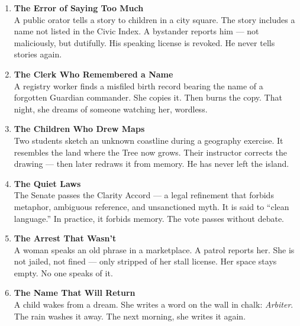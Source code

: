 \documentclass[9pt]{article}
\begin{document}
\begin{center}
\begin{enumerate}
    \item \textbf{The Error of Saying Too Much} \\
    A public orator tells a story to children in a city square. The story includes a name not listed in the Civic Index. A bystander reports him — not maliciously, but dutifully. His speaking license is revoked. He never tells stories again.

    \vspace{.3in}
    \item \textbf{The Clerk Who Remembered a Name} \\
    A registry worker finds a misfiled birth record bearing the name of a forgotten Guardian commander. She copies it. Then burns the copy. That night, she dreams of someone watching her, wordless.

    \vspace{.3in}
    \item \textbf{The Children Who Drew Maps} \\
    Two students sketch an unknown coastline during a geography exercise. It resembles the land where the Tree now grows. Their instructor corrects the drawing — then later redraws it from memory. He has never left the island.

    \vspace{.3in}
    \item \textbf{The Quiet Laws} \\
    The Senate passes the Clarity Accord — a legal refinement that forbids metaphor, ambiguous reference, and unsanctioned myth. It is said to “clean language.” In practice, it forbids memory. The vote passes without debate.

    \vspace{.3in}
    \item \textbf{The Arrest That Wasn’t} \\
    A woman speaks an old phrase in a marketplace. A patrol reports her. She is not jailed, not fined — only stripped of her stall license. Her space stays empty. No one speaks of it.

    \vspace{.3in}
    \item \textbf{The Name That Will Return} \\
    A child wakes from a dream. She writes a word on the wall in chalk: \textit{Arbiter}. The rain washes it away. The next morning, she writes it again.

\end{enumerate}
\end{center}
\end{document}
